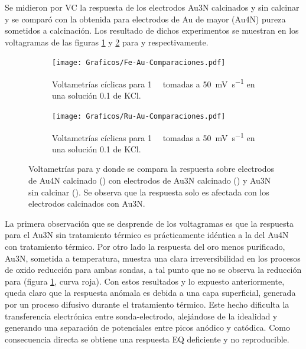 {			Se midieron por VC la respuesta de los electrodos Au3N calcinados y sin calcinar y se comparó con la obtenida para electrodos de Au de mayor (Au4N) pureza sometidos a calcinación. Los resultado de dichos experimentos se muestran en los voltagramas de las figuras \ref{fig:Fe-Au-compa} y \ref{fig:Ru-Au-compa} para \aminorutenio\space y \ferroferri\space respectivamente.

				\begin{figure}[ht]
		 	      \begin{subfigure}[t]{0.495\textwidth}
		          	\texttt{[image: Graficos/Fe-Au-Comparaciones.pdf]}
		         	\caption{Voltametrías cíclicas para \fe\space \SI{1}{\milli\Molar} tomadas a \SI{50}{\milli\volt\per\second} en una solución \SI{0.1}{\Molar} de KCl.}
		          	\label{fig:Fe-Au-compa}
		      		\end{subfigure}
		      	 \begin{subfigure}[t]{0.495\textwidth}
		          	\texttt{[image: Graficos/Ru-Au-Comparaciones.pdf]}
		         	\caption{Voltametrías cíclicas para \ru\space \SI{1}{\milli\Molar} tomadas a \SI{50}{\milli\volt\per\second} en una solución \SI{0.1}{\Molar} de KCl.}
		          	\label{fig:Ru-Au-compa}
		      		\end{subfigure}
		      	 \caption[Comparación entre electrodos calcinados y sin calcinar]{Voltametrías para \fe\space y \ru\space donde se compara la respuesta sobre electrodos de Au4N calcinado (\usebox{\oliva}) con electrodos de Au3N calcinado (\usebox{\negro}) y Au3N sin calcinar (\usebox{\rojo}). Se observa que la respuesta solo es afectada con los electrodos calcinados con Au3N.}
		      	 \label{Fig:Comparacion-Au}
	      		 \end{figure}	

			La primera observación que se desprende de los voltagramas es que la respuesta para el Au3N sin tratamiento térmico es prácticamente idéntica a la del Au4N con tratamiento térmico. Por otro lado la respuesta del oro menos purificado, Au3N, sometida a temperatura, muestra una clara irreversibilidad en los procesos de oxido reducción para ambas sondas, a tal punto que no se observa la reducción para \ferroferri\space (figura \ref{fig:Fe-Au-compa}, curva roja). Con estos resultados y lo expuesto anteriormente, queda claro que la respuesta anómala es debida a una capa superficial, generada por un proceso difusivo durante el tratamiento térmico. Este hecho dificulta la transferencia electrónica entre sonda-electrodo, alejándose de la idealidad y generando una separación de potenciales entre picos anódico y catódica. Como consecuencia directa se obtiene una respuesta EQ deficiente y no reproducible.  
			
}
